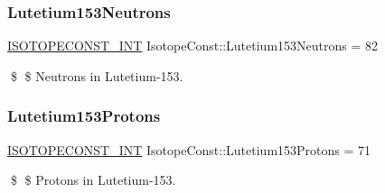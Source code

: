 \subsubsection{\texorpdfstring{Lutetium153\+Neutrons}{Lutetium153Neutrons}}
{\footnotesize\ttfamily \mbox{\hyperlink{group___isotope_const-_macros_ga5f18360b3e99483a35c32d789e62621c}{I\+S\+O\+T\+O\+P\+E\+C\+O\+N\+S\+T\+\_\+\+I\+NT}} Isotope\+Const\+::\+Lutetium153\+Neutrons = 82}

\$ \$ Neutrons in Lutetium-\/153. \mbox{\label{group___isotope_const-_lutetium-_lu153_gad1a5ce58c0cc383786c26e61623d6288}} 
\subsubsection{\texorpdfstring{Lutetium153\+Protons}{Lutetium153Protons}}
{\footnotesize\ttfamily \mbox{\hyperlink{group___isotope_const-_macros_ga5f18360b3e99483a35c32d789e62621c}{I\+S\+O\+T\+O\+P\+E\+C\+O\+N\+S\+T\+\_\+\+I\+NT}} Isotope\+Const\+::\+Lutetium153\+Protons = 71}

\$ \$ Protons in Lutetium-\/153. 